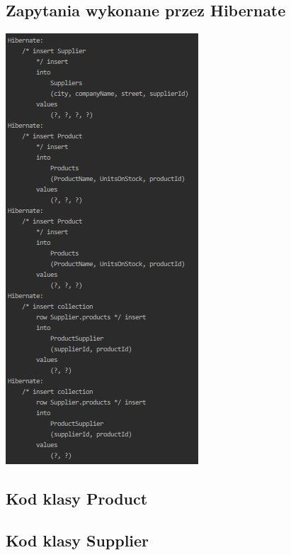 \documentclass[a4paper, 11pt]{article}
\begin{document}
    \subsection{Zapytania wykonane przez Hibernate}
    \begin{center}
        \includegraphics[scale=1.3]{images/point5/hibernateQueries.png}
    \end{center}

    \newpage

    \subsection{Kod klasy Product}
    

    \newpage

    \subsection{Kod klasy Supplier}
    
\end{document}
